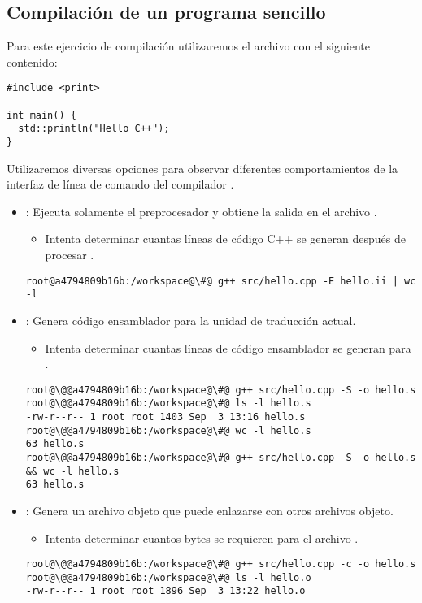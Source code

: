 \subsection{Compilación de un programa sencillo}

Para este ejercicio de compilación utilizaremos el archivo  
con el siguiente contenido:

\begin{lstlisting}
#include <print>

int main() {
  std::println("Hello C++");
}
\end{lstlisting}

Utilizaremos diversas opciones para observar diferentes comportamientos de la
interfaz de línea de comando del compilador
.

\begin{itemize}
  \item {}: 
        Ejecuta solamente el preprocesador y obtiene la salida en el archivo 
        .
    \begin{itemize}
      \item Intenta determinar cuantas líneas de código C++ se generan después 
            de procesar .
    \end{itemize}
\begin{lstlisting}[style=terminal,escapechar=@]
root@a4794809b16b:/workspace@\#@ g++ src/hello.cpp -E hello.ii | wc -l
\end{lstlisting}


  \item {}:
        Genera código ensamblador para la unidad de traducción actual.
    \begin{itemize}
      \item Intenta determinar cuantas líneas de código ensamblador se generan 
            para .
    \end{itemize}
\begin{lstlisting}[style=terminal,escapechar=@]
root@\@@a4794809b16b:/workspace@\#@ g++ src/hello.cpp -S -o hello.s
root@\@@a4794809b16b:/workspace@\#@ ls -l hello.s
-rw-r--r-- 1 root root 1403 Sep  3 13:16 hello.s
root@\@@a4794809b16b:/workspace@\#@ wc -l hello.s 
63 hello.s
root@\@@a4794809b16b:/workspace@\#@ g++ src/hello.cpp -S -o hello.s && wc -l hello.s 
63 hello.s
\end{lstlisting}

  \item {}:
        Genera un archivo objeto  que puede enlazarse con 
        otros archivos objeto.
    \begin{itemize}
      \item Intenta determinar cuantos bytes se requieren para el archivo .
    \end{itemize}
\begin{lstlisting}[style=terminal,escapechar=@]
root@\@@a4794809b16b:/workspace@\#@ g++ src/hello.cpp -c -o hello.s
root@\@@a4794809b16b:/workspace@\#@ ls -l hello.o
-rw-r--r-- 1 root root 1896 Sep  3 13:22 hello.o
\end{lstlisting}


\end{itemize}
